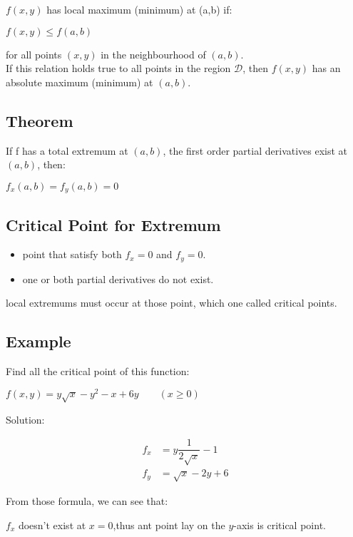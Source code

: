 \documentclass[UTF8,a4paper, 10pt, openany]{svmono}
\begin{document}
$f(x,y)$ has local maximum (minimum) at (a,b) if:

\begin{center}
$f(x,y)\leq f(a,b)$
\end{center}

for all points $(x,y)$ in the neighbourhood of $(a,b)$.\\

If this relation holds true to all points in the region $\mathcal{D}$, then $f(x,y)$ has an absolute maximum (minimum) at $(a,b)$.

\subsection{Theorem}
If f has a total extremum at $(a,b)$, the first order partial derivatives exist at $(a,b)$, then:

\begin{center}
$f_x(a,b)=f_y(a,b)=0$
\end{center}

\subsection{Critical Point for Extremum}
\begin{itemize}
\item point that satisfy both $f_x=0$ and $f_y=0$.
\item one or both partial derivatives do not exist.
\end{itemize}

local extremums must occur at those point, which one called critical points.

\subsection{Example}
Find all the critical point of this function:
\begin{center}
$f(x,y)=y\sqrt{x}-y^2-x+6y\qquad (x\geq 0)$
\end{center}

Solution:

\begin{align*}
f_x &=y\dfrac{1}{2\sqrt{x}}-1\\
f_y &=\sqrt{x}-2y+6
\end{align*}

From those formula, we can see that:

$f_x$ doesn't exist at $x=0$,thus ant point lay on the $y$-axis is critical point.
\end{document}
